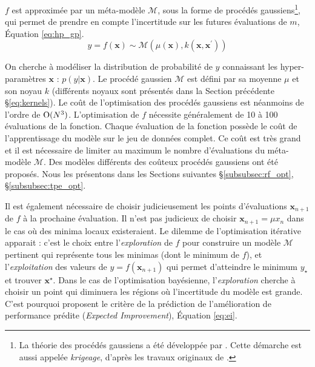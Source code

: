 $f$ est approximée par un méta-modèle $\mathcal{M}$, sous la forme de procédés gaussiens\footnote{La théorie des procédés gaussiens a été développée par \citeauthor{matheron_principles_1963} \cite{matheron_principles_1963}. Cette démarche est aussi appelée \textit{krigeage}, d'après les travaux originaux de \citeauthor{krige_statistical_1951} \cite{krige_statistical_1951}.}, qui permet de prendre en compte l'incertitude sur les futures évaluations de $m$, Équation \ref{eq:hp_gp}.
\begin{equation} \label{eq:hp_gp}
y = f(\boldsymbol{x}) \sim \mathcal{M}\left(\mu(\boldsymbol{x}), k\left(\boldsymbol{x}, \boldsymbol{x}^{\prime}\right)\right)
\end{equation}

On cherche à modéliser la distribution de probabilité de $y$ connaissant les hyper-paramètres $\boldsymbol{x}$ : $p(y | \boldsymbol{x})$.
Le procédé gaussien $\mathcal{M}$ est défini par sa moyenne $\mu$ et son noyau $k$ (différents noyaux sont présentés dans la Section précédente §\ref{eq:kernels}).
Le coût de l'optimisation des procédés gaussiens est néanmoins de l'ordre de $\operatorname{O}(N^3)$.
L'optimisation de $f$ nécessite généralement de 10 à 100 évaluations de la fonction.
Chaque évaluation de la fonction possède le coût de l'apprentissage du modèle sur le jeu de données complet.
Ce coût est très grand et il est nécessaire de limiter au maximum le nombre d'évaluations du méta-modèle $\mathcal{M}$.
Des modèles différents des coûteux procédés gaussiens ont été proposés.
Nous les présentons dans les Sections suivantes §\ref{subsubsec:rf_opt}, §\ref{subsubsec:tpe_opt}.

Il est également nécessaire de choisir judicieusement les points d'évaluations $\boldsymbol{x}_{n+1}$ de $f$ à la prochaine évaluation.
Il n'est pas judicieux de choisir $\boldsymbol{x}_{n+1} = \mu{x_{n}}$ dans le cas où des minima locaux existeraient.
Le dilemme de l'optimisation itérative apparait : c'est le choix entre l'\textit{exploration} de $f$ pour construire un modèle $\mathcal{M}$ pertinent qui représente tous les minimas (dont le minimum de $f$), et l'\textit{exploitation} des valeurs de $y = f(\boldsymbol{x}_{n+1})$ qui permet d'atteindre le minimum $y_{\star}$ et trouver $\boldsymbol{x}^{\star}$.
Dans le cas de l'optimisation bayésienne, l'\textit{exploration} cherche à choisir un point qui diminuera les régions où l'incertitude du modèle est grande.
C'est pourquoi \citeauthor{jones_efficient_1998} \cite{jones_efficient_1998} proposent le critère de la prédiction de l'amélioration de performance prédite (\textit{Expected Improvement}), Équation \ref{eq:ei}.

